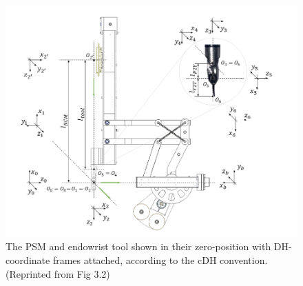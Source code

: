 \begin{figure}[htb!]
    \centering
    \includegraphics[width=1.0\linewidth]{figures/PSMcoord.png}
    \caption{The PSM and endowrist tool shown in their zero-position with DH-coordinate frames attached, according to the cDH convention. (Reprinted from \cite{walder2022design} Fig 3.2)}
    \label{fig:PSMCoord}
\end{figure}